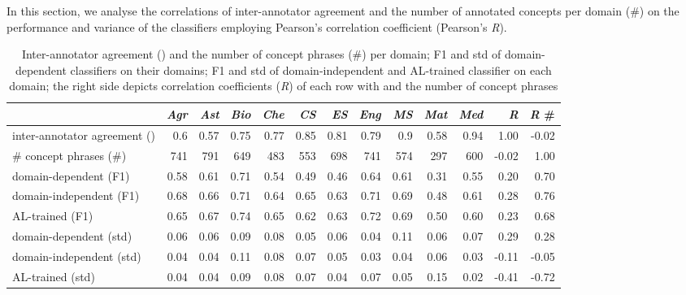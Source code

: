 \documentclass[runningheads]{llncs}
\begin{document}
In this section, we analyse the correlations of inter-annotator agreement  and the number of annotated concepts per domain (\#) on the performance and variance of the classifiers employing Pearson's correlation coefficient (Pearson's \textit{R}).

\begin{table}[htb]
\caption{Inter-annotator agreement () and the number of concept phrases (\#) per domain; F1 and std of domain-dependent classifiers on their domains; F1 and std of domain-independent and AL-trained classifier on each domain; the right side depicts correlation coefficients (\textit{R}) of each row with  and the number of concept phrases}
\begin{tabular}{l|rrrrrrrrrr|rr}
  & \textit{Agr} & \textit{Ast} & \textit{Bio} & \textit{Che} & \textit{CS} & \textit{ES} & \textit{Eng} & \textit{MS} & \textit{Mat} & \textit{Med} & \textit{R}  & \textit{R} \# \\ \hline        
inter-annotator agreement () &         0.6           & 0.57          & 0.75         & 0.77          & 0.85          & 0.81          & 0.79          & 0.9           & 0.58          & 0.94 & 1.00 & -0.02          \\
\# concept phrases (\#)         & 741           & 791           & 649          & 483           & 553           & 698           & 741           & 574           & 297           & 600 & -0.02 &  1.00         \\
\hline
domain-dependent (F1)   & 0.58          & 0.61          & 0.71         & 0.54          & 0.49          & 0.46          & 0.64          & 0.61          & 0.31          & 0.55 & 0.20 & 0.70         \\
domain-independent (F1)   & 0.68          & 0.66          & 0.71         & 0.64          & 0.65          & 0.63          & 0.71          & 0.69          & 0.48          & 0.61 & 0.28 & 0.76         \\
AL-trained (F1)   & 0.65	    & 0.67	        & 0.74         & 0.65	       & 0.62	    & 0.63          & 0.72         & 0.69	         & 0.50	        & 0.60& 0.23 & 0.68          \\
\hline
domain-dependent (std)  & 0.06         & 0.06         & 0.09         & 0.08         & 0.05         & 0.06         & 0.04         & 0.11         & 0.06         & 0.07 & 0.29 & 0.28      \\
domain-independent (std) & 0.04 & 0.04 & 0.11 & 0.08 & 0.07 & 0.05  & 0.03 & 0.04 & 0.06 & 0.03 & -0.11 & -0.05 \\
AL-trained (std) & 0.04    & 0.04	& 0.09	& 0.08	& 0.07	& 0.04	& 0.07	& 0.05	& 0.15	& 0.02 & -0.41 & -0.72 \\
\end{tabular}
\label{tab:correlation_variables}
\end{table}
\end{document}
